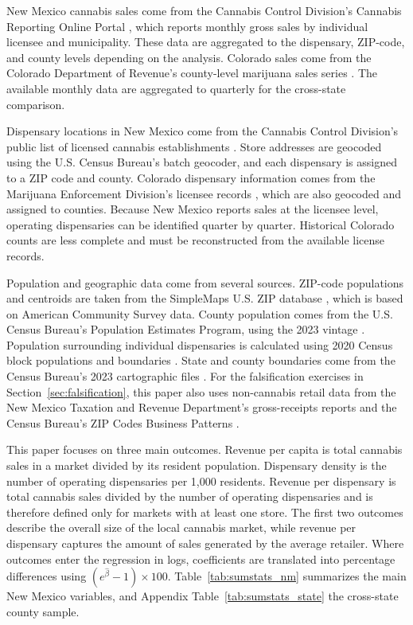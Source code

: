 \documentclass[english,12pt]{article}
\begin{document}
New Mexico cannabis sales come from the Cannabis Control Division's Cannabis Reporting Online Portal \citep{NMCCDReporting}, which reports monthly gross sales by individual licensee and municipality. These data are aggregated to the dispensary, ZIP-code, and county levels depending on the analysis. Colorado sales come from the Colorado Department of Revenue's county-level marijuana sales series \citep{COMarijuanaSalesByCounty}. The available monthly data are aggregated to quarterly for the cross-state comparison.

Dispensary locations in New Mexico come from the Cannabis Control Division's public list of licensed cannabis establishments \citep{NMCCDLicensees}. Store addresses are geocoded using the U.S. Census Bureau's batch geocoder, and each dispensary is assigned to a ZIP code and county. Colorado dispensary information comes from the Marijuana Enforcement Division's licensee records \citep{COMedLicensees}, which are also geocoded and assigned to counties. Because New Mexico reports sales at the licensee level, operating dispensaries can be identified quarter by quarter. Historical Colorado counts are less complete and must be reconstructed from the available license records.

Population and geographic data come from several sources. ZIP-code populations and centroids are taken from the SimpleMaps U.S. ZIP database \citep{SimpleMapsZIP}, which is based on American Community Survey data. County population comes from the U.S. Census Bureau's Population Estimates Program, using the 2023 vintage \citep{CensusPopEst2023}. Population surrounding individual dispensaries is calculated using 2020 Census block populations and boundaries \citep{CensusBlocks2020}. State and county boundaries come from the Census Bureau's 2023 cartographic files \citep{CensusCountyShapefile}. For the falsification exercises in Section~\ref{sec:falsification}, this paper also uses non-cannabis retail data from the New Mexico Taxation and Revenue Department's gross-receipts reports \citep{NMTRDGrossReceipts} and the Census Bureau's ZIP Codes Business Patterns \citep{CensusZBP}.

This paper focuses on three main outcomes. Revenue per capita is total cannabis sales in a market divided by its resident population. Dispensary density is the number of operating dispensaries per 1,000 residents. Revenue per dispensary is total cannabis sales divided by the number of operating dispensaries and is therefore defined only for markets with at least one store. The first two outcomes describe the overall size of the local cannabis market, while revenue per dispensary captures the amount of sales generated by the average retailer. Where outcomes enter the regression in logs, coefficients are translated into percentage differences using $(e^{\hat\beta}-1)\times100$. Table~\ref{tab:sumstats_nm} summarizes the main New Mexico variables, and Appendix Table~\ref{tab:sumstats_state} the cross-state county sample. 
\end{document}
